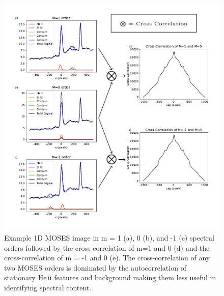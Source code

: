 \documentclass[]{solarphysics}
\begin{document}
\begin{article}
 	 	\begin{figure}
 	 		\includegraphics[scale = 1.5]{methods_fig_1.pdf}
 	 		\caption{Example 1D MOSES image in m = 1 (a), 0 (b), and -1 (c) spectral orders followed by the cross correlation of m=1 and 0 (d) and the cross-correlation of m = -1 and 0 (e).  The cross-correlation of any two MOSES orders is dominated by the autocorrelation of stationary He\,{\sc ii} features and background making them less useful in identifying spectral content.}
 	 		\label{fig:methods1}
 	 	\end{figure}
 	 	

\end{article}
\end{document}
